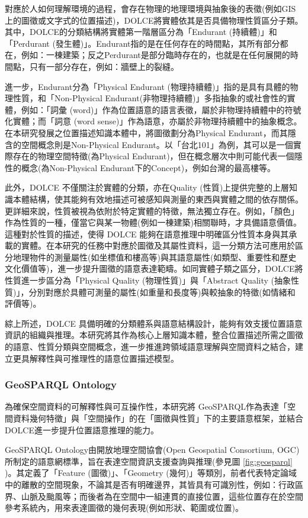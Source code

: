 對應於人如何理解環境的過程，會存在物理的地理環境與抽象後的表徵(例如GIS上的圖徵或文字式的位置描述)，DOLCE將實體依其是否具備物理性質區分子類。其中，DOLCE的分類結構將實體第一階層區分為「Endurant (持續體)」和「Perdurant (發生體)」。Endurant指的是在任何存在的時間點，其所有部分都在，例如：一棟建築；反之Perdurant是部分臨時存在的，也就是在任何展開的時間點，只有一部分存在，例如：牆壁上的裂縫。

進一步，Endurant分為「Physical Endurant (物理持續體)」指的是具有具體的物理性質，和「Non-Physical Endurant(非物理持續體)」多指抽象的或社會性的實體，例如：「詞彙 (word)」作為位置語意的語言表徵，屬於非物理持續體中的符號化實體；而「詞意 (word sense)」作為語意，亦屬於非物理持續體中的抽象概念。在本研究發展之位置描述知識本體中，將圖徵劃分為Physical Endurant，而其隱含的空間概念則是Non-Physical Endurant。以「台北101」為例，其可以是一個實際存在的物理空間特徵(為Physical Endurant)，但在概念層次中則可能代表一個隱性的概念(為Non-Physical Endurant下的Concept)，例如台灣的最高樓等。

此外，DOLCE 不僅關注於實體的分類，亦在Quality (性質)上提供完整的上層知識本體結構，使其能夠有效地描述可被感知與測量的東西與實體之間的依存關係。更詳細來說，性質被視為依附於特定實體的特徵，無法獨立存在。例如，「顏色」作為性質的一種，僅當它與某一物體(例如一棟建築)相關聯時，才具備語意價值。這種對於性質的描述，使得 DOLCE 能夠在語意推理中明確區分性質本身與其承載的實體。在本研究的任務中對應於圖徵及其屬性資料，這一分類方法可應用於區分地理物件的測量屬性(如坐標值和樓高等)與其語意屬性(如類型、重要性和歷史文化價值等)，進一步提升圖徵的語意表達範疇。如同實體子類之區分，DOLCE將性質進一步區分為「Physical Quality (物理性質)」與「Abstract Quality (抽象性質)」，分別對應於具體可測量的屬性(如重量和長度等)與較抽象的特徵(如情緒和評價等)。

綜上所述，DOLCE 具備明確的分類體系與語意結構設計，能夠有效支援位置語意資訊的組織與推理。本研究將其作為核心上層知識本體，整合位置描述所需之圖徵的語意、性質分類與空間概念，進一步推進跨領域語意理解與空間資料之結合，建立更具解釋性與可推理性的語意位置描述模型。

\subsubsection{GeoSPARQL Ontology}

為確保空間資料的可解釋性與可互操作性，本研究將 GeoSPARQL作為表達「空間資料幾何特徵」與「空間操作」的在「圖徵與性質」下的主要語意框架，並結合 DOLCE進一步提升位置語意推理的能力。

GeoSPARQL Ontology由開放地理空間協會(Open Geospatial Consortium, OGC)所制定的語意網標準，旨在表達空間資訊支援查詢與推理(參見圖 \ref{fig:geosparql} )。其定義了「Feature (圖徵)」、「Geometry (幾何)」等類別，前者代表特定論域中的離散的空間現象，不論其是否有明確邊界，其皆具有可識別性，例如：行政區界、山脈及颱風等；而後者為在空間中一組連貫的直接位置，這些位置存在於空間參考系統內，用來表達圖徵的幾何表現(例如形狀、範圍或位置)。

